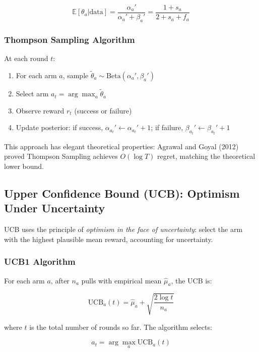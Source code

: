 \begin{equation}
\mathbb{E}[\theta_a | \text{data}] = \frac{\alpha_a'}{\alpha_a' + \beta_a'} = \frac{1 + s_a}{2 + s_a + f_a}
\end{equation}

\subsubsection{Thompson Sampling Algorithm}

At each round $t$:

\begin{enumerate}
    \item For each arm $a$, sample $\tilde{\theta}_a \sim \text{Beta}(\alpha_a', \beta_a')$
    \item Select arm $a_t = \arg\max_a \tilde{\theta}_a$
    \item Observe reward $r_t$ (success or failure)
    \item Update posterior: if success, $\alpha_{a_t}' \leftarrow \alpha_{a_t}' + 1$; if failure, $\beta_{a_t}' \leftarrow \beta_{a_t}' + 1$
\end{enumerate}

This approach has elegant theoretical properties: Agrawal and Goyal (2012) proved Thompson Sampling achieves $O(\log T)$ regret, matching the theoretical lower bound.

\subsection{Upper Confidence Bound (UCB): Optimism Under Uncertainty}

UCB uses the principle of \textit{optimism in the face of uncertainty}: select the arm with the highest plausible mean reward, accounting for uncertainty.

\subsubsection{UCB1 Algorithm}

For each arm $a$, after $n_a$ pulls with empirical mean $\hat{\mu}_a$, the UCB is:

\begin{equation}
\text{UCB}_a(t) = \hat{\mu}_a + \sqrt{\frac{2 \log t}{n_a}}
\end{equation}

where $t$ is the total number of rounds so far. The algorithm selects:

\begin{equation}
a_t = \arg\max_a \text{UCB}_a(t)
\end{equation}

